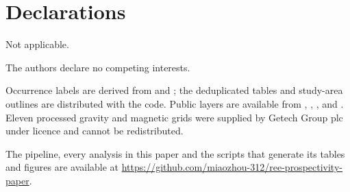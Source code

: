 \documentclass[pdflatex,sn-apa]{sn-jnl}
\begin{document}
\section*{Declarations}

Not applicable.

The authors declare no competing interests.

Occurrence labels are derived from \citet{Orris2018} and \citet{Parsa2024}; the deduplicated tables and study-area outlines are distributed with the code. Public layers are available from \citet{McCafferty2023}, \citet{Jobin2017}, \citet{Miles2016}, \citet{BradleyDC2008} and \citet{Wheeler1996}. Eleven processed gravity and magnetic grids were supplied by Getech Group plc under licence and cannot be redistributed.

The pipeline, every analysis in this paper and the scripts that generate its tables and figures are available at \url{https://github.com/miaozhou-312/ree-prospectivity-paper}.
\end{document}
